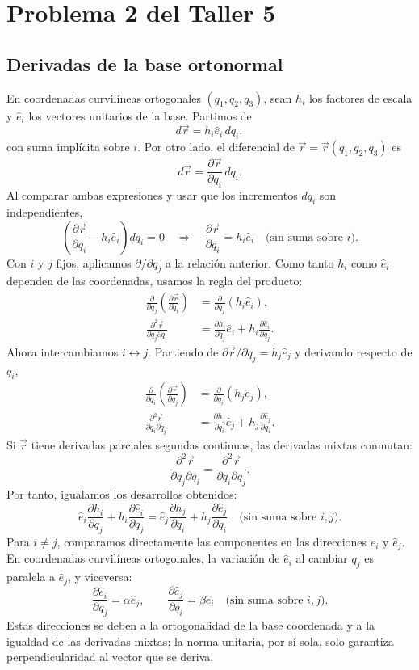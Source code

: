 \section{Problema 2 del Taller 5}

\subsection{Derivadas de la base ortonormal}

En coordenadas curvilíneas ortogonales $(q_1,q_2,q_3)$, sean $h_i$ los factores de escala y $\hat e_i$ los vectores unitarios de la base. Partimos de
\[
d\vec r=h_i\hat e_i\,dq_i,
\]
con suma implícita sobre $i$. Por otro lado, el diferencial de $\vec r=\vec r(q_1,q_2,q_3)$ es
\[
d\vec r=\frac{\partial\vec r}{\partial q_i}\,dq_i.
\]
Al comparar ambas expresiones y usar que los incrementos $dq_i$ son independientes,
\[
\left(\frac{\partial\vec r}{\partial q_i}-h_i\hat e_i\right)dq_i=0
\quad\Longrightarrow\quad
\boxed{\frac{\partial\vec r}{\partial q_i}=h_i\hat e_i}
\quad\text{(sin suma sobre $i$)}.
\]
Con $i$ y $j$ fijos, aplicamos $\partial/\partial q_j$ a la relación anterior. Como tanto $h_i$ como $\hat e_i$ dependen de las coordenadas, usamos la regla del producto:
\[
\begin{aligned}
\frac{\partial}{\partial q_j}
\left(\frac{\partial\vec r}{\partial q_i}\right)
&=\frac{\partial}{\partial q_j}(h_i\hat e_i),\\
\frac{\partial^2\vec r}{\partial q_j\partial q_i}
&=\frac{\partial h_i}{\partial q_j}\hat e_i
+h_i\frac{\partial\hat e_i}{\partial q_j}.
\end{aligned}
\]
Ahora intercambiamos $i\leftrightarrow j$. Partiendo de $\partial\vec r/\partial q_j=h_j\hat e_j$ y derivando respecto de $q_i$,
\[
\begin{aligned}
\frac{\partial}{\partial q_i}
\left(\frac{\partial\vec r}{\partial q_j}\right)
&=\frac{\partial}{\partial q_i}(h_j\hat e_j),\\
\frac{\partial^2\vec r}{\partial q_i\partial q_j}
&=\frac{\partial h_j}{\partial q_i}\hat e_j
+h_j\frac{\partial\hat e_j}{\partial q_i}.
\end{aligned}
\]
Si $\vec r$ tiene derivadas parciales segundas continuas, las derivadas mixtas conmutan:
\[
\frac{\partial^2\vec r}{\partial q_j\partial q_i}
=\frac{\partial^2\vec r}{\partial q_i\partial q_j}.
\]
Por tanto, igualamos los desarrollos obtenidos:
\[
\hat e_i\frac{\partial h_i}{\partial q_j}
+h_i\frac{\partial\hat e_i}{\partial q_j}
=\hat e_j\frac{\partial h_j}{\partial q_i}
+h_j\frac{\partial\hat e_j}{\partial q_i}
\quad\text{(sin suma sobre $i,j$)}.
\]
Para $i\ne j$, comparamos directamente las componentes en las direcciones $\hat e_i$ y $\hat e_j$. En coordenadas curvilíneas ortogonales, la variación de $\hat e_i$ al cambiar $q_j$ es paralela a $\hat e_j$, y viceversa:
\[
\frac{\partial\hat e_i}{\partial q_j}=\alpha\hat e_j,
\qquad
\frac{\partial\hat e_j}{\partial q_i}=\beta\hat e_i
\quad\text{(sin suma sobre $i,j$)}.
\]
Estas direcciones se deben a la ortogonalidad de la base coordenada y a la igualdad de las derivadas mixtas; la norma unitaria, por sí sola, solo garantiza perpendicularidad al vector que se deriva.

